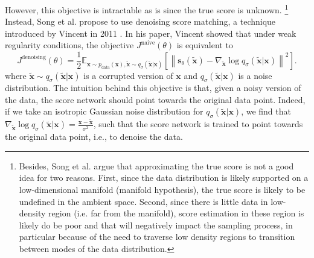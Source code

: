 \documentclass{article}
\begin{document}
However, this objective is intractable as is since the true score is unknown.
\footnote{Besides, Song et al. argue that approximating the true score is not a good idea 
for two reasons. First, since the data distribution is likely supported on a low-dimensional manifold (manifold hypothesis), the true score is likely to be undefined 
in the ambient space. Second, since there is little data in low-density region (i.e. far from the manifold), score estimation in these region is likely do be poor 
and that will negatively impact the sampling process, in particular because of the need to traverse low density regions to transition between modes of the data distribution.}
Instead, Song et al. propose to use denoising score matching, a technique introduced by Vincent in 2011 \cite{score-da}. In his paper, Vincent showed that under weak
regularity conditions, the objective $J^\text{naive}(\theta)$ is equivalent to
\begin{equation}
    \label{eq:score-denoising}
    J^\text{denoising}(\theta) = \frac{1}{2} \mathbb{E}_{\mathbf{x}\sim p_\text{data}(\mathbf{x}),\tilde {\mathbf{x}}\sim q_\sigma(\tilde {\mathbf{x}}|\mathbf{x})} \left[ \left\| \mathbf{s}_\theta(\tilde {\mathbf{x}}) - \nabla_{\tilde{ \mathbf{x}}} \log q_\sigma(\tilde {\mathbf{x}}|\mathbf{x}) \right\|^2 \right].
\end{equation}
where $\tilde {\mathbf{x}}\sim q_\sigma(\tilde {\mathbf{x}}|\mathbf{x})$ is a corrupted version of $\mathbf{x}$ and $q_\sigma(\tilde {\mathbf{x}}|\mathbf{x})$ is a noise distribution. 
The intuition behind this objective is that, given a noisy version of the data, the score network should point towards 
the original data point. Indeed, if we take an isotropic Gaussian noise distribution for $q_\sigma(\tilde {\mathbf{x}}|\mathbf{x})$,
we find that $\nabla_{\tilde {\mathbf{x}}} \log q_\sigma(\tilde {\mathbf{x}}|\mathbf{x}) = \frac{\mathbf{x} - \tilde {\mathbf{x}}}{\sigma^2}$, such that 
the score network is trained to point towards the original data point, i.e., to denoise the data.
\end{document}
